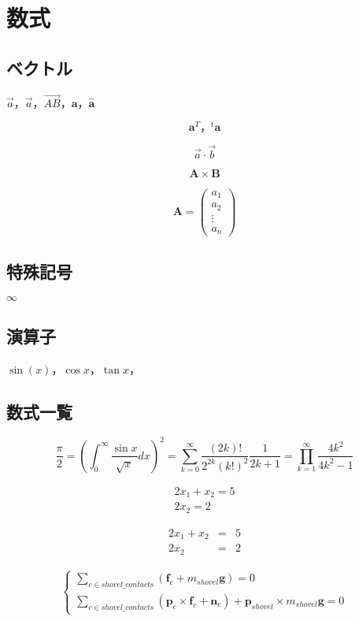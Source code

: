 \section{数式}
\subsection{ベクトル}
$\vec{a}$，$\overrightarrow{a}$，$\overrightarrow{AB}$，$\bm{a}$，$\bm{\hat{a}}$

\[
\bm{a}^T，{}^t\!\bm{a}
\]

\[
\vec{a} \cdot \vec{b}
\]

\[
\bm{A} \times \bm{B}
\]

\[
\bm{A} = \left(
\begin{array}{c}
  a_1 \\
  a_2 \\
  \vdots \\
  a_n
\end{array}
\right)
\]


\subsection{特殊記号}
$\infty$

\subsection{演算子}
$\sin(x)$，$\cos x$，$\tan x$，

\subsection{数式一覧}
\[
\frac{\pi}{2} =
\left( \int_{0}^{\infty} \frac{\sin x}{\sqrt{x}} dx \right)^2 =
\sum_{k=0}^{\infty} \frac{(2k)!}{2^{2k}(k!)^2} \frac{1}{2k+1} =
\prod_{k=1}^{\infty} \frac{4k^2}{4k^2 - 1}
\]

\begin{eqnarray}
  2x_1 + x_2 = 5 \\
  2x_2 = 2
\end{eqnarray}

\begin{eqnarray*}
  2x_1 + x_2 & = & 5 \\
  2x_2 & = & 2
\end{eqnarray*}

\begin{eqnarray}  
  \left\{ \begin{array}{l}
    \displaystyle \sum_{c \in shovel\_contacts} (\bm{f}_{c} + m_{shovel} \bm{g}) = 0 \\
    \displaystyle \sum_{c \in shovel\_contacts} (\bm{p}_{c} \times \bm{f}_{c} + \bm{n}_{c}) + \bm{p}_{shovel} \times m_{shovel} \bm{g} = 0
  \end{array} \right.
\end{eqnarray}

